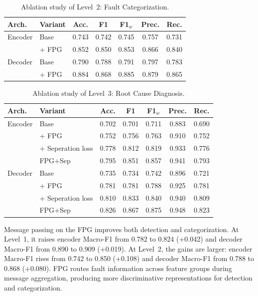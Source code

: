 \begin{table}[t]
\centering
\caption{Ablation study of Level~2: Fault Categorization.}
\label{tab:abl_l2}
\small
\begin{tabular}{l l c c c c c}
\toprule
\textbf{Arch.} & \textbf{Variant} & \textbf{Acc.} & \textbf{F1} & \textbf{F1$_w$} & \textbf{Prec.} & \textbf{Rec.} \\
\midrule
Encoder & Base & 0.743 & 0.742 & 0.745 & 0.757 & 0.731 \\
        & + FPG & 0.852 & 0.850 & 0.853 & 0.866 & 0.840 \\
\midrule
Decoder & Base & 0.790 & 0.788 & 0.791 & 0.797 & 0.783 \\
        & + FPG & 0.884 & 0.868 & 0.885 & 0.879 & 0.865 \\
\bottomrule
\end{tabular}
\end{table}

\begin{table}[t]
\centering
\caption{Ablation study of Level~3: Root Cause Diagnosis.}
\label{tab:abl_l3}
\small
\begin{tabular}{l l c c c c c}
\toprule
\textbf{Arch.} & \textbf{Variant} & \textbf{Acc.} & \textbf{F1} & \textbf{F1$_w$} & \textbf{Prec.} & \textbf{Rec.} \\
\midrule
Encoder & Base & 0.702 & 0.701 & 0.711 & 0.883 & 0.690 \\
        & + FPG & 0.752 & 0.756 & 0.763 & 0.910 & 0.752 \\
        & + Seperation loss & 0.778 & 0.812 & 0.819 & 0.933 & 0.776 \\
        &  FPG+Sep & 0.795 & 0.851 & 0.857 & 0.941 & 0.793 \\
\midrule
Decoder & Base & 0.735 & 0.734 & 0.742 & 0.896 & 0.721 \\
        & + FPG & 0.781 & 0.781 & 0.788 & 0.925 & 0.781 \\
        & + Seperation loss & 0.810 & 0.833 & 0.840 & 0.940 & 0.809 \\
        & FPG+Sep & 0.826 & 0.867 & 0.875 & 0.948 & 0.823 \\
\bottomrule
\end{tabular}
\end{table}

Message passing on the FPG improves both detection and categorization. At Level~1, it raises encoder Macro-F1 from 0.782 to 0.824 (+0.042) and decoder Macro-F1 from 0.890 to 0.909 (+0.019). At Level~2, the gains are larger: encoder Macro-F1 rises from 0.742 to 0.850 (+0.108) and decoder Macro-F1 from 0.788 to 0.868 (+0.080). FPG routes fault information across feature groups during message aggregation, producing more discriminative representations for detection and categorization.

